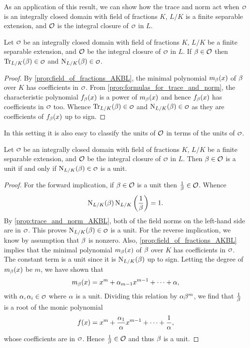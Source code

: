     As an application of this result, we can show how the trace and norm act when \(\smc{O}\) is an integrally closed domain with field of fractions \(K\), \(L/K\) is a finite separable extension, and \(\mathcal{O}\) is the integral closure of \(\smc{O}\) in \(L\).

    \begin{proposition}\label{prop:trace_and_norm_AKBL}
      Let \(\smc{O}\) be an integrally closed domain with field of fractions \(K\), \(L/K\) be a finite separable extension, and \(\mathcal{O}\) be the integral closure of \(\smc{O}\) in \(L\). If \(\beta \in \mathcal{O}\) then \(\Trace_{L/K}(\b) \in \smc{O}\) and \(\Norm_{L/K}(\b) \in \smc{O}\).
    \end{proposition}
    \begin{proof}
      By \cref{prop:field_of_fractions_AKBL}, the minimal polynomial \(m_{\beta}(x)\) of \(\beta\) over \(K\) has coefficients in \(\smc{O}\). From \cref{prop:formulas_for_trace_and_norm}, the characteristic polynomial \(f_{\beta}(x)\) is a power of \(m_{\beta}(x)\) and hence \(f_{\beta}(x)\) has coefficients in \(\smc{O}\) too. Whence \(\Trace_{L/K}(\b) \in \smc{O}\) and \(\Norm_{L/K}(\b) \in \smc{O}\) as they are coefficients of \(f_{\beta}(x)\) up to sign.
    \end{proof}

    In this setting it is also easy to classify the units of \(\mathcal{O}\) in terms of the units of \(\smc{O}\).

    \begin{proposition}\label{prop:unit_if_and_only_if_AKBL}
      Let \(\smc{O}\) be an integrally closed domain with field of fractions \(K\), \(L/K\) be a finite separable extension, and \(\mathcal{O}\) be the integral closure of \(\smc{O}\) in \(L\). Then \(\beta \in \mathcal{O}\) is a unit if and only if \(\Norm_{L/K}(\b) \in \smc{O}\) is a unit.
    \end{proposition}
    \begin{proof}
      For the forward implication, if \(\beta \in \mathcal{O}\) is a unit then \(\frac{1}{\beta} \in \mathcal{O}\). Whence
      \[
        \operatorname{\mathrm{N}}_{L/K}(\beta)\operatorname{\mathrm{N}}_{L/K}\left(\frac{1}{\beta}\right) = 1.
      \]
      By \cref{prop:trace_and_norm_AKBL}, both of the field norms on the left-hand side are in \(\smc{O}\). This proves \(\Norm_{L/K}(\b) \in \smc{O}\) is a unit. For the reverse implication, we know by assumption that \(\beta\) is nonzero. Also, \cref{prop:field_of_fractions_AKBL} implies that the minimal polynomial \(m_{\beta}(x)\) of \(\beta\) over \(K\) has coefficients in \(\smc{O}\). The constant term is a unit since it is \(\operatorname{\mathrm{N}}_{L/K}(\beta)\) up to sign. Letting the degree of \(m_{\beta}(x)\) be \(m\), we have shown that
      \[
        m_{\beta}(x) = x^{m}+\alpha_{m-1}x^{m-1}+\cdots+\alpha,
      \]
      with \(\a,\a_{i} \in \smc{O}\) where \(\alpha\) is a unit. Dividing this relation by \(\alpha\beta^{m}\), we find that \(\frac{1}{\beta}\) is a root of the monic polynomial
      \[
        f(x) = x^{m}+\frac{\alpha_{1}}{\alpha}x^{m-1}+\cdots+\frac{1}{\alpha},
      \]
      whose coefficients are in \(\smc{O}\). Hence \(\frac{1}{\beta} \in \mathcal{O}\) and thus \(\beta\) is a unit.
    \end{proof}

